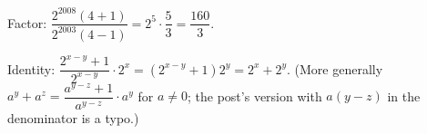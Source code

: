 Factor: $\dfrac{2^{2008}(4+1)}{2^{2003}(4-1)}=2^5\cdot\dfrac53=\boxed{\dfrac{160}3}$.

Identity: $\dfrac{2^{x-y}+1}{2^{x-y}}\cdot2^x=(2^{x-y}+1)2^y=2^x+2^y$. (More generally $a^y+a^z=\dfrac{a^{y-z}+1}{a^{y-z}}\cdot a^y$ for $a\ne0$; the post's version with $a(y-z)$ in the denominator is a typo.)
